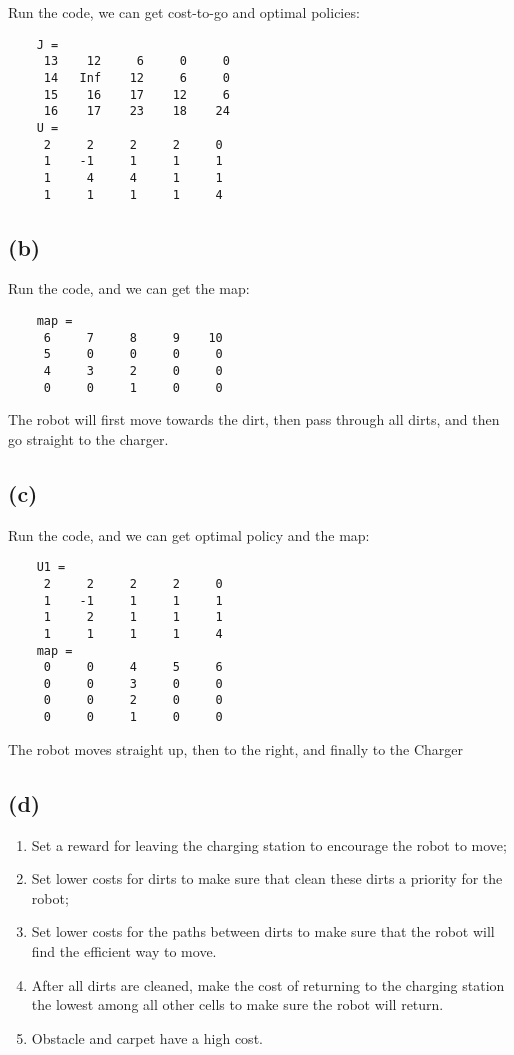 \documentclass[8pt, a4paper, oneside, justified]{article}
\numberwithin{equation}{section}
\begin{document}
Run the code, we can get cost-to-go and optimal policies:
\begin{lstlisting}
    J =
     13    12     6     0     0
     14   Inf    12     6     0
     15    16    17    12     6
     16    17    23    18    24
    U =
     2     2     2     2     0
     1    -1     1     1     1
     1     4     4     1     1
     1     1     1     1     4
\end{lstlisting}

\subsection*{(b)}

Run the code, and we can get the map:
\begin{lstlisting}
    map =
     6     7     8     9    10
     5     0     0     0     0
     4     3     2     0     0
     0     0     1     0     0
\end{lstlisting}

The robot will first move towards the dirt, then pass through all dirts, 
and then go straight to the charger.

\subsection*{(c)}

Run the code, and we can get optimal policy and the map:
\begin{lstlisting}
    U1 =
     2     2     2     2     0
     1    -1     1     1     1
     1     2     1     1     1
     1     1     1     1     4
    map =
     0     0     4     5     6
     0     0     3     0     0
     0     0     2     0     0
     0     0     1     0     0
\end{lstlisting}
The robot moves straight up, then to the right, and finally to the Charger

\subsection*{(d)}
\begin{enumerate}
    \item Set a reward for leaving the charging station to encourage the robot to move;
    \item Set lower costs for dirts to make sure that clean these dirts a priority for the robot;
    \item Set lower costs for the paths between dirts to make sure that the robot will 
    find the efficient way to move.
    \item After all dirts are cleaned, make the cost of returning to the charging station the 
    lowest among all other cells to make sure the robot will return.
    \item Obstacle and carpet have a high cost.
\end{enumerate}
\end{document}
